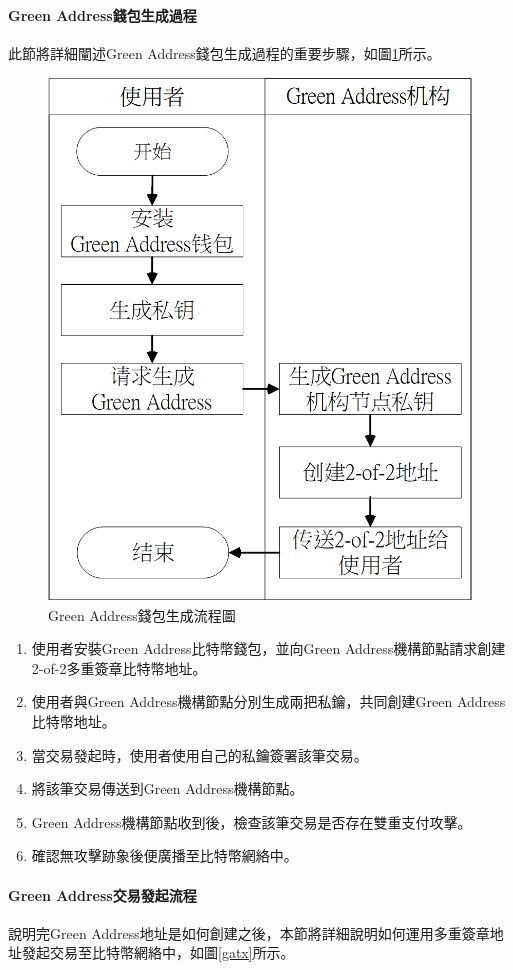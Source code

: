			 	\paragraph{Green Address錢包生成過程}
			 	此節將詳細闡述Green Address錢包生成過程的重要步驟，如圖\ref{gabuild}所示。
			 	\begin{figure}[htbp]
					\centering
					\includegraphics[width = .5\textwidth]{gabuild.png}
					\caption{Green Address錢包生成流程圖}\label{gabuild}
				\end{figure}

			 	\begin{enumerate}
			 		\item 使用者安裝Green Address比特幣錢包，並向Green Address機構節點請求創建2-of-2多重簽章比特幣地址。
			 		\item 使用者與Green Address機構節點分別生成兩把私鑰，共同創建Green Address比特幣地址。
			 		\item 當交易發起時，使用者使用自己的私鑰簽署該筆交易。
			 		\item 將該筆交易傳送到Green Address機構節點。
			 		\item Green Address機構節點收到後，檢查該筆交易是否存在雙重支付攻擊。
			 		\item 確認無攻擊跡象後便廣播至比特幣網絡中。
			 	\end{enumerate}

			 	\paragraph{Green Address交易發起流程}
			 	說明完Green Address地址是如何創建之後，本節將詳細說明如何運用多重簽章地址發起交易至比特幣網絡中，如圖\ref{gatx}所示。

